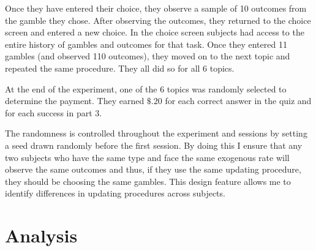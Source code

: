 \documentclass[
  12pt,
]{article}
\begin{document}
Once they have entered their choice, they observe a sample of 10
outcomes from the gamble they chose. After observing the outcomes, they
returned to the choice screen and entered a new choice. In the choice
screen subjects had access to the entire history of gambles and outcomes
for that task. Once they entered 11 gambles (and observed 110 outcomes),
they moved on to the next topic and repeated the same procedure. They
all did so for all 6 topics.

At the end of the experiment, one of the 6 topics was randomly selected
to determine the payment. They earned \(\$.20\) for each correct answer
in the quiz and for each success in part 3.

The randomness is controlled throughout the experiment and sessions by
setting a seed drawn randomly before the first session. By doing this I
ensure that any two subjects who have the same type and face the same
exogenous rate will observe the same outcomes and thus, if they use the
same updating procedure, they should be choosing the same gambles. This
design feature allows me to identify differences in updating procedures
across subjects.

\hypertarget{analysis}{%
\section{Analysis}\label{analysis}}

\renewcommand\refname{Conclusion}
  
\end{document}
